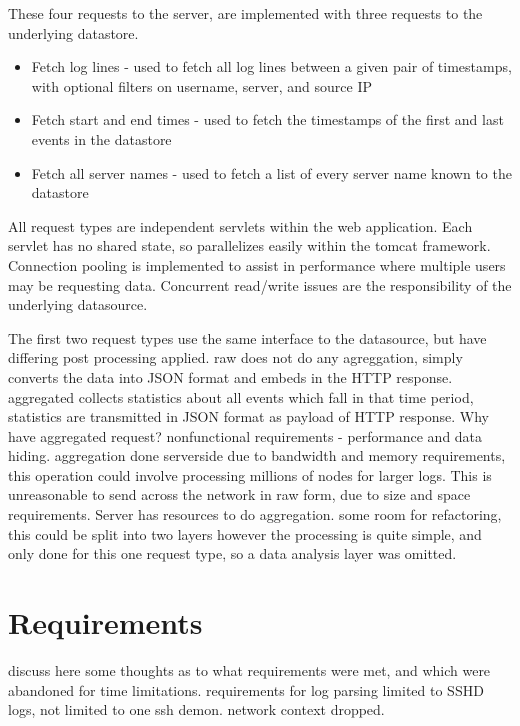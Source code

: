 These four requests to the server, are implemented with three requests to the underlying datastore.

\begin{itemize}
\item{Fetch log lines - used to fetch all log lines between a given pair of timestamps, with optional filters on username, server, and source IP}
\item{Fetch start and end times - used to fetch the timestamps of the first and last events in the datastore}
\item{Fetch all server names - used to fetch a list of every server name known to the datastore}
\end{itemize}

All request types are independent servlets within the web application. Each servlet has no shared state, so parallelizes easily within the tomcat framework. Connection pooling is implemented to assist in performance where multiple users may be requesting data. Concurrent read/write issues are the responsibility of the underlying datasource.

The first two request types use the same interface to the datasource, but have differing post processing applied. raw does not do any agreggation, simply converts the data into JSON format and embeds in the HTTP response. aggregated collects statistics about all events which fall in that time period, statistics are transmitted in JSON format as payload of HTTP response.
Why have aggregated request? nonfunctional requirements - performance and data hiding. aggregation done serverside due to bandwidth and memory requirements, this operation could involve processing millions of nodes for larger logs. This is unreasonable to send across the network in raw form, due to size and space requirements. Server has resources to do aggregation. 
some room for refactoring, this could be split into two layers
however the processing is quite simple, and only done for this one request type, so a data analysis layer was omitted.

\section{Requirements}
discuss here some thoughts as to what requirements were met, and which were abandoned for time limitations.
requirements for log parsing limited to SSHD logs, not limited to one ssh demon.
network context dropped.



